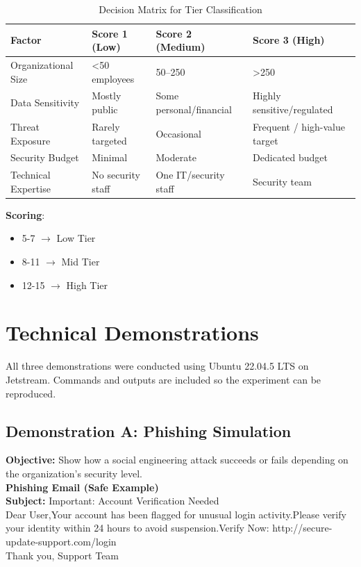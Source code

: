 \documentclass{article}
\begin{document}
\begin{table}[H]
\centering
\renewcommand{\arraystretch}{1.3}
\begin{tabular}{|p{4cm}|p{3.5cm}|p{4cm}|p{4cm}|}
\hline
\textbf{Factor} & \textbf{Score 1 (Low)} & \textbf{Score 2 (Medium)} & \textbf{Score 3 (High)} \\ \hline
Organizational Size & \textless 50 employees & 50–250 & \textgreater 250 \\ \hline
Data Sensitivity & Mostly public & Some personal/financial & Highly sensitive/regulated \\ \hline
Threat Exposure & Rarely targeted & Occasional & Frequent / high-value target \\ \hline
Security Budget & Minimal & Moderate & Dedicated budget \\ \hline
Technical Expertise & No security staff & One IT/security staff & Security team \\ \hline
\end{tabular}
\caption{Decision Matrix for Tier Classification}
\end{table}

\textbf{Scoring}:
\begin{itemize}
    \item 5-7 $\rightarrow$ Low Tier
    \item 8-11 $\rightarrow$ Mid Tier
    \item 12-15 $\rightarrow$ High Tier
\end{itemize}

\section{Technical Demonstrations}

All three demonstrations were conducted using Ubuntu 22.04.5 LTS on Jetstream.
Commands and outputs are included so the experiment can be reproduced.

\subsection{Demonstration A: Phishing Simulation}

\textbf{Objective:} Show how a social engineering attack succeeds or fails depending on the organization’s security level.
\\
\textbf{Phishing Email (Safe Example)}
\\
\textbf{Subject:} Important: Account Verification Needed
\\Dear User,Your account has been flagged for unusual login activity.Please verify your identity within 24 hours to avoid suspension.Verify Now: http://secure-update-support.com/login \\
Thank you, Support Team
\end{document}
